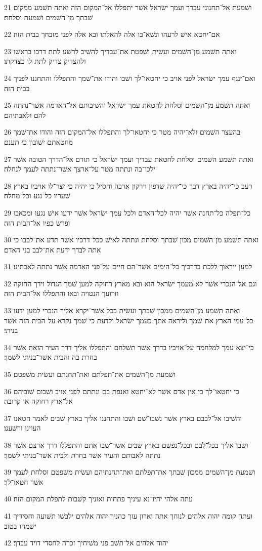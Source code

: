 \par 21 ושׁמעת אל־תחנוני עבדך ועמך ישׂראל אשׁר יתפללו אל־המקום הזה ואתה תשׁמע ממקום שׁבתך מן־השׁמים ושׁמעת וסלחת׃
\par 22 אם־יחטא אישׁ לרעהו ונשׁא־בו אלה להאלתו ובא אלה לפני מזבחך בבית הזה׃
\par 23 ואתה תשׁמע מן־השׁמים ועשׂית ושׁפטת את־עבדיך להשׁיב לרשׁע לתת דרכו בראשׁו ולהצדיק צדיק לתת לו כצדקתו׃
\par 24 ואם־ינגף עמך ישׂראל לפני אויב כי יחטאו־לך ושׁבו והודו את־שׁמך והתפללו והתחננו לפניך בבית הזה׃
\par 25 ואתה תשׁמע מן־השׁמים וסלחת לחטאת עמך ישׂראל והשׁיבותם אל־האדמה אשׁר־נתתה להם ולאבתיהם׃
\par 26 בהעצר השׁמים ולא־יהיה מטר כי יחטאו־לך והתפללו אל־המקום הזה והודו את־שׁמך מחטאתם ישׁובון כי תענם׃
\par 27 ואתה תשׁמע השׁמים וסלחת לחטאת עבדיך ועמך ישׂראל כי תורם אל־הדרך הטובה אשׁר ילכו־בה ונתתה מטר על־ארצך אשׁר־נתתה לעמך לנחלה׃
\par 28 רעב כי־יהיה בארץ דבר כי־יהיה שׁדפון וירקון ארבה וחסיל כי יהיה כי יצר־לו אויביו בארץ שׁעריו כל־נגע וכל־מחלה׃
\par 29 כל־תפלה כל־תחנה אשׁר יהיה לכל־האדם ולכל עמך ישׂראל אשׁר ידעו אישׁ נגעו ומכאבו ופרשׂ כפיו אל־הבית הזה׃
\par 30 ואתה תשׁמע מן־השׁמים מכון שׁבתך וסלחת ונתתה לאישׁ ככל־דרכיו אשׁר תדע את־לבבו כי אתה לבדך ידעת את־לבב בני האדם׃
\par 31 למען ייראוך ללכת בדרכיך כל־הימים אשׁר־הם חיים על־פני האדמה אשׁר נתתה לאבתינו׃
\par 32 וגם אל־הנכרי אשׁר לא מעמך ישׂראל הוא ובא מארץ רחוקה למען שׁמך הגדול וידך החזקה וזרועך הנטויה ובאו והתפללו אל־הבית הזה׃
\par 33 ואתה תשׁמע מן־השׁמים ממכון שׁבתך ועשׂית ככל אשׁר־יקרא אליך הנכרי למען ידעו כל־עמי הארץ את־שׁמך וליראה אתך כעמך ישׂראל ולדעת כי־שׁמך נקרא על־הבית הזה אשׁר בניתי׃
\par 34 כי־יצא עמך למלחמה על־אויביו בדרך אשׁר תשׁלחם והתפללו אליך דרך העיר הזאת אשׁר בחרת בה והבית אשׁר־בניתי לשׁמך׃
\par 35 ושׁמעת מן־השׁמים את־תפלתם ואת־תחנתם ועשׂית משׁפטם׃
\par 36 כי יחטאו־לך כי אין אדם אשׁר לא־יחטא ואנפת בם ונתתם לפני אויב ושׁבום שׁוביהם אל־ארץ רחוקה או קרובה׃
\par 37 והשׁיבו אל־לבבם בארץ אשׁר נשׁבו־שׁם ושׁבו והתחננו אליך בארץ שׁבים לאמר חטאנו העוינו ורשׁענו׃
\par 38 ושׁבו אליך בכל־לבם ובכל־נפשׁם בארץ שׁבים אשׁר־שׁבו אתם והתפללו דרך ארצם אשׁר נתתה לאבותם והעיר אשׁר בחרת ולבית אשׁר־בניתי לשׁמך׃
\par 39 ושׁמעת מן־השׁמים ממכון שׁבתך את־תפלתם ואת־תחנתיהם ועשׂית משׁפטם וסלחת לעמך אשׁר חטאו־לך׃
\par 40 עתה אלהי יהיו־נא עיניך פתחות ואזניך קשׁבות לתפלת המקום הזה׃
\par 41 ועתה קומה יהוה אלהים לנוחך אתה וארון עזך כהניך יהוה אלהים ילבשׁו תשׁועה וחסידיך ישׂמחו בטוב׃
\par 42 יהוה אלהים אל־תשׁב פני משׁיחיך זכרה לחסדי דויד עבדך׃

